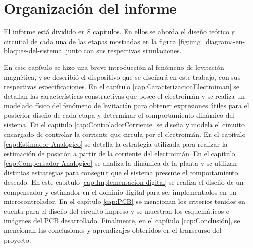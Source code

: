 \section{Organización del informe}

El informe está dividido en 8 capítulos. En ellos se aborda el diseño teórico y circuital de cada una de las etapas mostradas en la figura \ref{fig:img_diagrama-en-bloques-del-sistema} junto con sus respectivas simulaciones.

En este capítulo se hizo una breve introducción al fenómeno de levitación magnética, y se describió el dispositivo que se diseñará en este trabajo, con sus respectivas especificaciones. En el capítulo \ref{cap:CaracterizacionElectroiman} se detallan las características constructivas que posee el electroimán y se realiza un modelado físico del fenómeno de levitación para obtener expresiones útiles para el posterior diseño de cada etapa y determinar el comportamiento dinámico del sistema. En el capítulo \ref{cap:ControladorCorriente} se diseña y modela el circuito encargado de controlar la corriente que circula por el electroimán. En el capítulo \ref{cap:Estimador Analogico} se detalla la estrategia utilizada para realizar la estimación de posición a partir de la corriente del electroimán. En el capítulo \ref{cap:Compensador Analogico} se analiza la dinámica de la planta y se utilizan distintas estrategias para conseguir que el sistema presente el comportamiento deseado. En este capítulo \ref{cap:Implementacion digital} se realiza el diseño de un compensador y estimador en el dominio digital para ser implementados en un microcontrolador. En el capítulo \ref{cap:PCB} se mencionan los criterios tenidos en cuenta para el diseño del circuito impreso y se muestran los esquemáticos e imágenes del PCB desarrollado. Finalmente, en el capítulo \ref{cap:Conclusión}, se mencionan las conclusiones y aprendizajes obtenidos en el transcurso del proyecto.

 